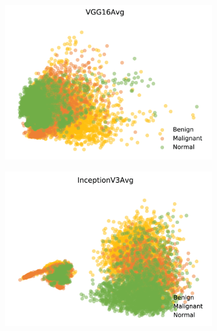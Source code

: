 \begin{figure}[H]
    \centering
    \begin{subfigure}{.2\textwidth}
      \includegraphics[width=\textwidth]{contents/chapter_4/resources/visualisation_transfer_vgg16avg.png}
    \end{subfigure}
    \begin{subfigure}{.2\textwidth}
      \includegraphics[width=\textwidth]{contents/chapter_4/resources/visualisation_transfer_inceptionv3avg.png}
    \end{subfigure}
    \begin{subfigure}{.2\textwidth}

\end{subfigure}
\end{figure}
